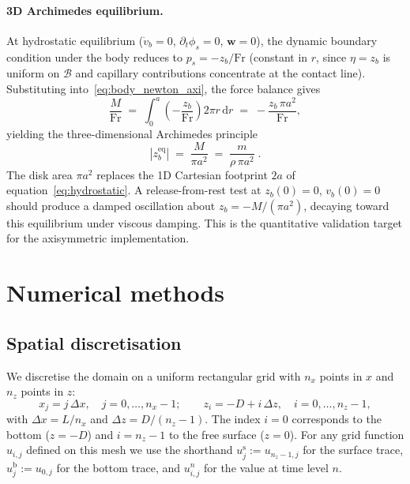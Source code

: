 \documentclass{article}
\newcommand{\Fr}{\mathrm{Fr}}
\newcommand{\ww}{\mathbf{w}}
\begin{document}
\paragraph{3D Archimedes equilibrium.}
At hydrostatic equilibrium ($\dot v_b = 0$, $\partial_t \phi_s = 0$, $\ww = 0$), the dynamic boundary condition under the body reduces to $p_s = -z_b/\Fr$ (constant in $r$, since $\eta = z_b$ is uniform on $\mathcal{B}$ and capillary contributions concentrate at the contact line).
Substituting into~\eqref{eq:body_newton_axi}, the force balance gives
\begin{equation}
    \frac{M}{\Fr} \;=\; \int_0^{a}\!\!\left(-\frac{z_b}{\Fr}\right) 2\pi r\,\mathrm{d} r \;=\; -\frac{z_b\,\pi a^2}{\Fr},
\end{equation}
yielding the three-dimensional Archimedes principle
\begin{equation}
    \boxed{\;|z_b^{\mathrm{eq}}| \;=\; \frac{M}{\pi a^2} \;=\; \frac{m}{\rho\,\pi a^2}\;.\;}
    \label{eq:Archimedes_3D}
\end{equation}
The disk area $\pi a^2$ replaces the 1D Cartesian footprint $2a$ of equation~\eqref{eq:hydrostatic}.
A release-from-rest test at $z_b(0) = 0$, $v_b(0) = 0$ should produce a damped oscillation about $z_b = -M/(\pi a^2)$, decaying toward this equilibrium under viscous damping.
This is the quantitative validation target for the axisymmetric implementation.
\color{black}


\section{Numerical methods}
\label{sec:numerical}

\subsection{Spatial discretisation}
\label{sec:spatial}

We discretise the domain on a uniform rectangular grid with $n_x$ points in $x$ and $n_z$ points in $z$:
\begin{equation}
    x_j = j\,\Delta x, \quad j = 0, \ldots, n_x - 1; \qquad
    z_i = -D + i\,\Delta z, \quad i = 0, \ldots, n_z - 1,
\end{equation}
with $\Delta x = L/n_x$ and $\Delta z = D/(n_z - 1)$.
The index $i = 0$ corresponds to the bottom ($z = -D$) and $i = n_z - 1$ to the free surface ($z = 0$).
\color{blue}
For any grid function $u_{i,j}$ defined on this mesh we use the shorthand $u_j^{\mathrm{s}} := u_{n_z-1, j}$ for the surface trace, $u_j^{\mathrm{b}} := u_{0, j}$ for the bottom trace, and $u^{n}_{i,j}$ for the value at time level $n$.
\end{document}
